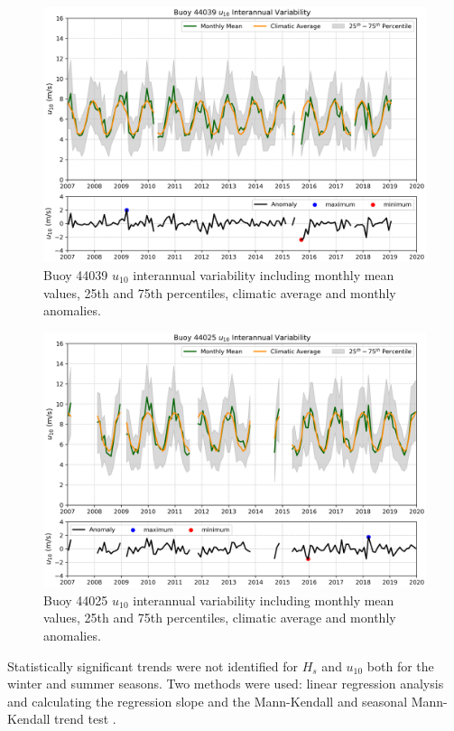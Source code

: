 \begin{figure}[H]
\centering
\includegraphics[width=0.83\linewidth]{Figures/Chapter5/b44039_interranual_anomaly.png}
\caption{Buoy 44039 $u_{10}$ interannual variability including monthly mean values, 25th and 75th percentiles, climatic average and monthly anomalies.}
\label{fig:b44039_wind_inter}
\end{figure}


\begin{figure}[H]
\centering
\includegraphics[width=0.83\linewidth]{Figures/Chapter5/b44025_interranual_anomaly.png}
\caption{Buoy 44025 $u_{10}$ interannual variability including monthly mean values, 25th and 75th percentiles, climatic average and monthly anomalies.}
\label{fig:b44025_wind_inter}
\end{figure}


Statistically significant trends were not identified for $H_{s}$ and $u_{10}$ both for the winter and summer seasons. Two methods were used: linear regression analysis and calculating the regression slope and the Mann-Kendall and seasonal Mann-Kendall trend test \cite{Hussain2019}.



